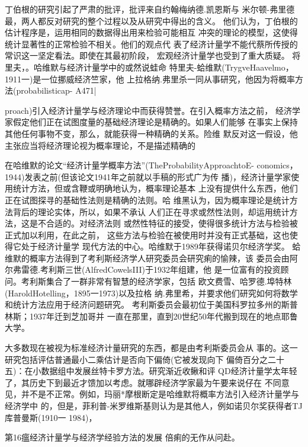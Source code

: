 丁伯根的研究引起了严肃的批评，批评来自约翰梅纳德.凯恩斯与
米尔顿-弗里德最，两人都反对研究的整个过程以及从研究中得出的含义。
他们认为，丁伯根的估计程序是，运用相同的数据得出用来检验可能相互
冲突的理论的模型，这使得统计显著性的正常检验不相关。他们的观点代
表了经济计量学不能代蔡所传授的常识这一坚定看法。即使在其最初阶段，
宏观经济计量学也受到了重大质疑。
将里夫，。哈维默与经济计量学中的或然说蛙命
特里夫-蛤维默(TrygveHaavelmo，1911一)是一位挪威经济竺家，他
上拉格纳.弗里杀一同从事研究，他因为将概率方法(probabilisticap-
A471|

proach)引入经济计量学与经济理论中而获得赞誉。在引入概率方法之前，
经济学家假定他们正在试图度量的基础经济理论是精确的。如果人们能够
在事实上保持其他任何事物不变，那么，就能获得一种精确的关系。险维
默反对这一假设，他主张应当将经济理论视为概率理论，不是描述精确的

在哈维默的论文“经济计量学概率方法”(TheProbabilityApproachtoE-
conomics，1944)发表之前(但该论文1941年之前就以手稿的形式广为传
播)，经济计量学家使用统计方法，但或含鞭或明确地认为，概率理论基本
上没有提供什么东西，他们正在试图探寻的基础性法则是精确的法则。哈
维黑认为，因为概率理论是统计方法背后的理论实体，所以，如果不承认
人们正在寻求或然性法则，却运用统计方法，这是不合适的。对经济法则
或然性特征的接受，使得很多统计方法与检验被正式加以利用，在此之前，
这些方法与检验在被使用时并没有正式基础，这也使得它处于经济计量学
现代方法的中心。哈维默于1989年获得诺贝尔经济学奖。
蛤维默的概率方法得到了考利斯经济学人研究委员会研究痢的愉辣，该
委员会由阿尔弗雷德.考利斯三世(AlfredCowelsIII)于1932年组建，他
是一位富有的投资顾问。考利斯集合了一群非常有智慧的经济学家，包括
欧文费雪、哈罗德.埠特林(HaroldHotelling，1895一1973)以及拉格
纳.弗里希，并要求他们研究如何将数学和统计方法应用于经济问题研究。
考利斯委员会最初位于美国科罗拉多州的斯普林斯；1937年迁到芝加哥并
一直在那里，直到20世纪50年代搬到现在的地点耶鲁大学。

大多数现在被视为标准经济计量研究的东西，都是由考利斯委员会从
事的。这一研究包括评估普通最小二乘估计是否向下偏倚(它被发现向下
偏倚百分之二十五)：在小数据组中发展丝特卡罗方法。研究渐近收鳅和评
QD经济计量学太年轻了，其历史下到最近才馈加以考虑。就哪辟经济学家最为午要来说仔在
不同意见，并不是不正常。例如，玛丽*摩根断定是哈维默将概率方法引入经济计量学与经济学中
的，但是，菲利普-米罗维斯基则认为是其他人，例如诺贝尔奖获得者TJ库普曼斯(1910一
1984)，

第16瘟经济计量学与经济学经验方法的发展
倍痢的无作从问赴。

